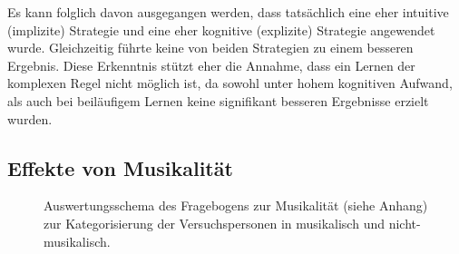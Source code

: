 \documentclass[doc,a4paper,12pt]{apa6}
\begin{document}
Es kann folglich davon ausgegangen werden, dass tatsächlich eine eher intuitive (implizite) Strategie und eine eher kognitive (explizite) Strategie angewendet wurde. Gleichzeitig führte keine von beiden Strategien zu einem besseren Ergebnis. Diese Erkenntnis stützt eher die Annahme, dass ein Lernen der komplexen Regel nicht möglich ist, da sowohl unter hohem kognitiven Aufwand, als auch bei beiläufigem  Lernen keine signifikant besseren Ergebnisse erzielt wurden.

\subsection{Effekte von Musikalität}

\begin{figure}[t]
  \centering
  \begin{minipage}{\textwidth}
    \vspace{10pt}
    \caption{Auswertungsschema des Fragebogens zur Musikalität (siehe Anhang) zur Kategorisierung der Versuchspersonen in musikalisch und nicht-musikalisch.}
    \label{musik:aufbau}
  \end{minipage}
\end{figure}
\end{document}
